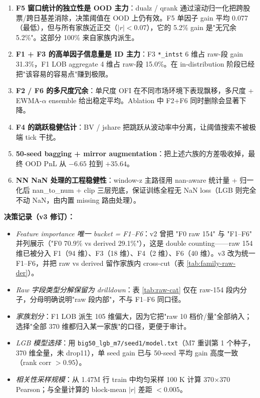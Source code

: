 \documentclass[10.5pt,a4paper]{article}
\begin{document}
\begin{enumerate}[leftmargin=2em,itemsep=2pt,topsep=2pt]
  \item \textbf{F5 窗口统计的独立性是 OOD 主力}：dualz / qrank 通过滚动归一化把跨股票/跨日基差消除，决策阈值在 OOD 上仍有效。F5 单因子 gain 平均 0.077（最低），但与所有家族近正交（$|r|<0.07$），它的 5.2\% gain 是"无冗余 5.2\%"。这部分 100\% 来自家族内派生。
  \item \textbf{F1 + F3 的高单因子信息量是 ID 主力}：F3 \texttt{*\_intst} 6 维占 raw-段 gain 31.3\%，F1 LOB aggregate 4 维占 raw-段 15.0\%。在 in-distribution 阶段已经把"该容易的容易点"赚到极限。
  \item \textbf{F2 / F6 的多尺度冗余}：单尺度 OFI 在不同市场环境下表现飘移，多尺度 + EWMA-$\alpha$ ensemble 给出稳定平均。Ablation 中 F2+F6 同时删除会显著下降。
  \item \textbf{F4 的跳跃稳健估计}：BV / jshare 把跳跃从波动率中分离，让阈值搜索不被极端 tick 干扰。
  \item \textbf{50-seed bagging + mirror augmentation}：把上述六族的方差吸收掉，最终 OOD PnL 从 $-6.65$ 拉到 $+35.64$。
  \item \textbf{NN NaN 处理的工程稳健性}：window-z 主路径用 nan-aware 统计量 + 归一化后 nan\_to\_num + clip 三层兜底，保证训练全程无 NaN loss（LGB 则完全不动 NaN，由内置 missing 路由处理）。
\end{enumerate}

\textbf{决策记录（v3 修订）：}
\begin{itemize}[leftmargin=2em,itemsep=2pt,topsep=2pt]
  \item \emph{Feature importance 唯一 bucket = F1--F6}：v2 曾把 "F0 raw 154" 与 "F1--F6" 并列展示（"F0 70.9\% vs derived 29.1\%"），这是 double counting——raw 154 维已被分入 F1（94 维）、F3（18 维）、F4（2 维）、F6（40 维）。v3 改为统一 F1--F6，并把 raw vs derived 留作家族内 cross-cut（表 \ref{tab:family-raw-der}）。
  \item \emph{Raw 字段类型分解保留为 drilldown}：表 \ref{tab:raw-cat} 仅在 raw-154 段内分子，分母明确说明"raw 段内部"，不与 F1--F6 同口径。
  \item \emph{家族划分}：F1 LOB 派生 105 维偏大，因为它把"raw 10 档价/量"全部纳入；选择"全部 370 维都归入某一家族"的口径，更便于审计。
  \item \emph{LGB 模型选择}：用 \texttt{big50\_lgb\_m7/seed1/model.txt}（M7 重训第 1 个种子，370 维全量，未 drop11），单 seed gain 已与 50-seed 平均 gain 高度一致（rank corr $>0.95$）。
  \item \emph{相关性采样规模}：从 1.47M 行 train 中均匀采样 100 K 计算 370$\times$370 Pearson；与全量计算的 block-mean $|r|$ 差距 $<0.005$。
\end{itemize}
\end{document}
